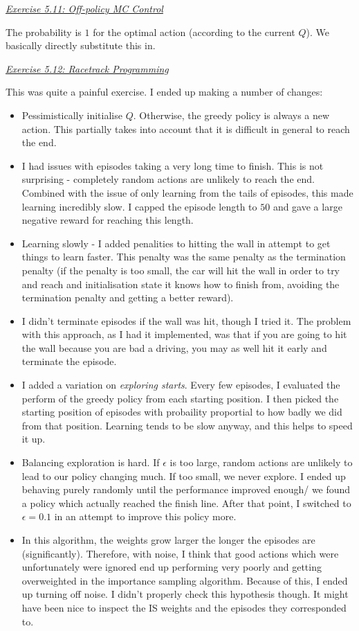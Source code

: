 \documentclass{article}
\newcommand{\myq}[1]{%
	\vspace{1em}
	\noindent\underline{\emph{Exercise #1}}\vspace{0.25em}\linebreak
}
\begin{document}
 \myq{5.11: Off-policy MC Control}
 The probability is $1$ for the optimal action (according to the current $Q$). We basically directly substitute this in. 
 
 \myq{5.12: Racetrack Programming}
 This was quite a painful exercise. I ended up making a number of changes:
 \begin{itemize}[noitemsep]
 	\item Pessimistically initialise $Q$. Otherwise, the greedy policy is always a new action. This partially takes into account that it is difficult in general to reach the end. 
 	
 	\item I had issues with episodes taking a very long time to finish. This is not surprising - completely random actions are unlikely to reach the end. Combined with the issue of only learning from the tails of episodes, this made learning incredibly slow. I capped the episode length to $50$ and gave a large negative reward for reaching this length. 
 	
 	\item Learning slowly - I added penalities to hitting the wall in attempt to get things to learn faster. This penalty was the same penalty as the termination penalty (if the penalty is too small, the car will hit the wall in order to try and reach and initialisation state it knows how to finish from, avoiding the termination penalty and getting a better reward). 
 	
 	\item I didn't terminate episodes if the wall was hit, though I tried it. The problem with this approach, as I had it implemented, was that if you are going to hit the wall because you are bad a driving, you may as well hit it early and terminate the episode. 
 	
 	\item I added a variation on \emph{exploring starts}. Every few episodes, I evaluated the perform of the greedy policy from each starting position. I then picked the starting position of episodes with probaility proportial to how badly we did from that position. Learning tends to be slow anyway, and this helps to speed it up. 
 	
 	\item Balancing exploration is hard. If $\epsilon$ is too large, random actions are unlikely to lead to our policy changing much. If too small, we never explore. I ended up behaving purely randomly until the performance improved enough/ we found a policy which actually reached the finish line. After that point, I switched to $\epsilon=0.1$ in an attempt to improve this policy more.
 	
 	\item In this algorithm, the weights grow larger the longer the episodes are (significantly). Therefore, with noise, I think that good actions which were unfortunately were ignored end up performing very poorly and getting overweighted in the importance sampling algorithm. Because of this, I ended up turning off noise. I didn't properly check this hypothesis though. It might have been nice to inspect the IS weights and the episodes they corresponded to. 
 \end{itemize}
\end{document}
